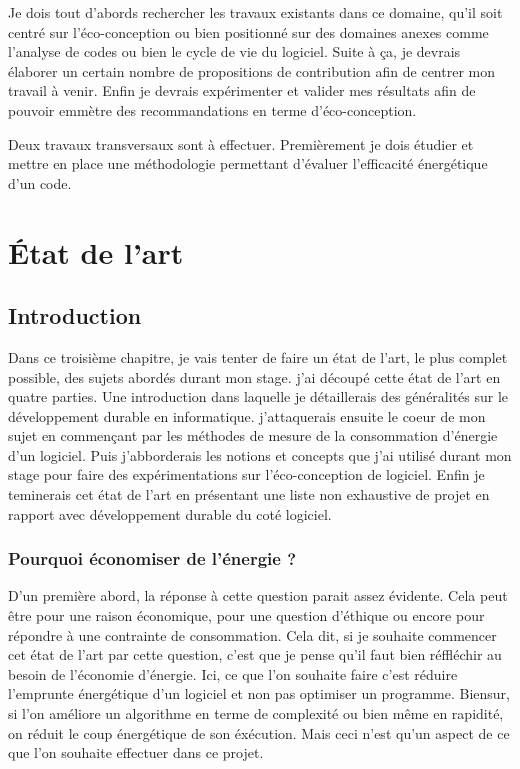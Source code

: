 \documentclass[a4paper, 11pt]{report}
\begin{document}
Je dois tout d'abords rechercher les travaux existants dans ce domaine, qu'il soit centré sur l'éco-conception ou bien positionné sur des domaines anexes comme l'analyse de codes ou bien le cycle de vie du logiciel. Suite à ça, je devrais élaborer un certain nombre de propositions de contribution afin de centrer mon travail à venir. Enfin je devrais expérimenter et valider mes résultats afin de pouvoir emmètre des recommandations en terme d'éco-conception.

Deux travaux transversaux sont à effectuer. Premièrement je dois étudier et mettre en place une méthodologie permettant d'évaluer l'efficacité énergétique d'un code.

\chapter{État de l'art}
	\section{Introduction}
Dans ce troisième chapitre, je vais tenter de faire un état de l'art, le plus complet possible, des sujets abordés durant mon stage. j'ai découpé cette état de l'art en quatre parties. Une introduction dans laquelle je détaillerais des généralités sur le développement durable en informatique. j'attaquerais ensuite le coeur de mon sujet en commençant par les méthodes de mesure de la consommation d'énergie d'un logiciel. Puis j'abborderais les notions et concepts que j'ai utilisé durant mon stage pour faire des expérimentations sur l'éco-conception de logiciel. Enfin je teminerais cet état de l'art en présentant une liste non exhaustive de projet en rapport avec développement durable du coté logiciel.

		\subsection{Pourquoi économiser de l'énergie ?}
D'un première abord, la réponse à cette question parait assez évidente. Cela peut être pour une raison économique, pour une question d'éthique ou encore pour répondre à une contrainte de consommation. Cela dit, si je souhaite commencer cet état de l'art par cette question, c'est que je pense qu'il faut bien réffléchir au besoin de l'économie d'énergie. Ici, ce que l'on souhaite faire c'est réduire l'emprunte énergétique d'un logiciel et non pas optimiser un programme. Biensur, si l'on améliore un algorithme en terme de complexité ou bien même en rapidité, on réduit le coup énergétique de son éxécution. Mais ceci n'est qu'un aspect de ce que l'on souhaite effectuer dans ce projet. 
\end{document}
